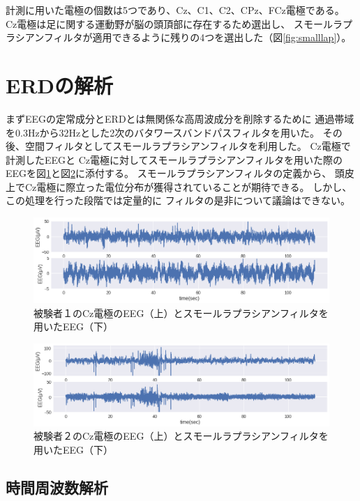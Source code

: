 計測に用いた電極の個数は5つであり、Cz、C1、C2、CPz、FCz電極である。
Cz電極は足に関する運動野が脳の頭頂部に存在するため選出し、
スモールラプラシアンフィルタが適用できるように残りの4つを選出した（図\ref{fig:smalllap}）。


\section{ERDの解析}
まずEEGの定常成分とERDとは無関係な高周波成分を削除するために
通過帯域を0.3Hzから32Hzとした2次のバタワースバンドパスフィルタを用いた。
その後、空間フィルタとしてスモールラプラシアンフィルタを利用した。
Cz電極で計測したEEGと
Cz電極に対してスモールラプラシアンフィルタを用いた際の
EEGを図\ref{fig:eegsub1}と図\ref{fig:eegsub2}に添付する。
スモールラプラシアンフィルタの定義から、
頭皮上でCz電極に際立った電位分布が獲得されていることが期待できる。
しかし、この処理を行った段階では定量的に
フィルタの是非について議論はできない。

\begin{figure}
    \centering
    \includegraphics[width=13cm]{images/eeg_sub1.png}
    \caption{被験者１のCz電極のEEG（上）とスモールラプラシアンフィルタを用いたEEG（下）}
    \label{fig:eegsub1}
\end{figure}
\begin{figure}
    \centering
    \includegraphics[width=13cm]{images/eeg_sub2.png}
    \caption{被験者２のCz電極のEEG（上）とスモールラプラシアンフィルタを用いたEEG（下）}
    \label{fig:eegsub2}
\end{figure}


\subsection{時間周波数解析}

